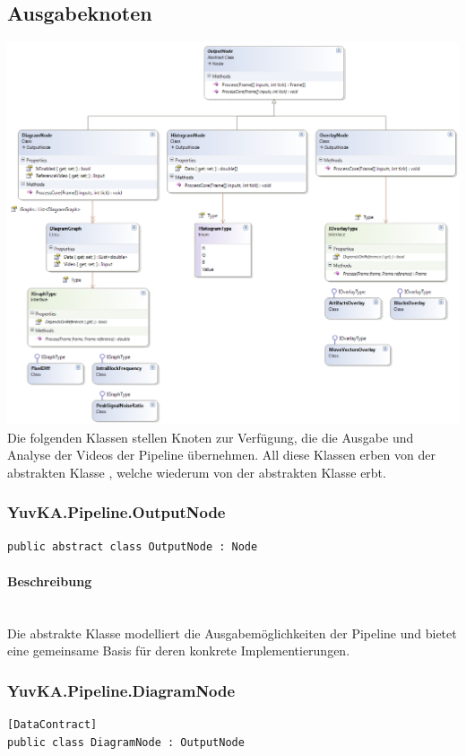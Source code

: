\subsection{Ausgabeknoten}

\includegraphics[width=\textwidth]{YuvKA.Pipeline/outputnodes.png}
Die folgenden Klassen stellen Knoten zur Verfügung, die die Ausgabe und Analyse der Videos der Pipeline übernehmen. All diese Klassen erben von der abstrakten Klasse , welche wiederum von der abstrakten Klasse  erbt.

\subsubsection{YuvKA.Pipeline.OutputNode}

\begin{verbatim}
public abstract class OutputNode : Node
\end{verbatim}

\paragraph{Beschreibung}~\\
Die abstrakte Klasse  modelliert die Ausgabemöglichkeiten der Pipeline und bietet eine gemeinsame Basis für deren konkrete Implementierungen.

\subsubsection{YuvKA.Pipeline.DiagramNode}
\begin{verbatim}
[DataContract]
public class DiagramNode : OutputNode
\end{verbatim}
